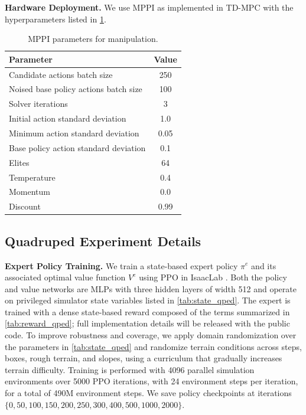 \textbf{Hardware Deployment.} We use MPPI as implemented in TD-MPC \cite{hansen2022temporal} with the hyperparameters listed in \cref{tab:mppi_manip}. 


\begin{table}[htb]
\caption{\footnotesize{MPPI parameters for manipulation.}}
\centering
\begin{tabular}{lc}
\hline
Parameter & Value \\
\hline
Candidate actions batch size & 250 \\
Noised base policy actions batch size & 100 \\
Solver iterations & 3\\
Initial action standard deviation & 1.0 \\
Minimum action standard deviation & 0.05 \\
Base policy action standard deviation & 0.1 \\
Elites & 64 \\
Temperature & 0.4 \\
Momentum & 0.0 \\
Discount & 0.99 \\
\hline
\end{tabular}
\vspace{0.05cm}
\label{tab:mppi_manip}
\end{table}




\subsection{Quadruped Experiment Details}
\label{app:qped}

\textbf{Expert Policy Training.} We train a state-based expert policy $\pi^e$ and its associated optimal value function $V^e$ using PPO in IsaacLab \cite{mittal2025isaaclab}. Both the policy and value networks are MLPs with three hidden layers of width 512 and operate on privileged simulator state variables listed in \cref{tab:state_qped}. The expert is trained with a dense state-based reward composed of the terms summarized in \cref{tab:reward_qped}; full implementation details will be released with the public code. To improve robustness and coverage, we apply domain randomization over the parameters in \cref{tab:state_qped} and randomize terrain conditions across steps, boxes, rough terrain, and slopes, using a curriculum that gradually increases terrain difficulty. Training is performed with 4096 parallel simulation environments over 5000 PPO iterations, with 24 environment steps per iteration, for a total of 490M environment steps. We save policy checkpoints at iterations $\{0, 50, 100, 150, 200, 250, 300, 400, 500, 1000, 2000\}$.


